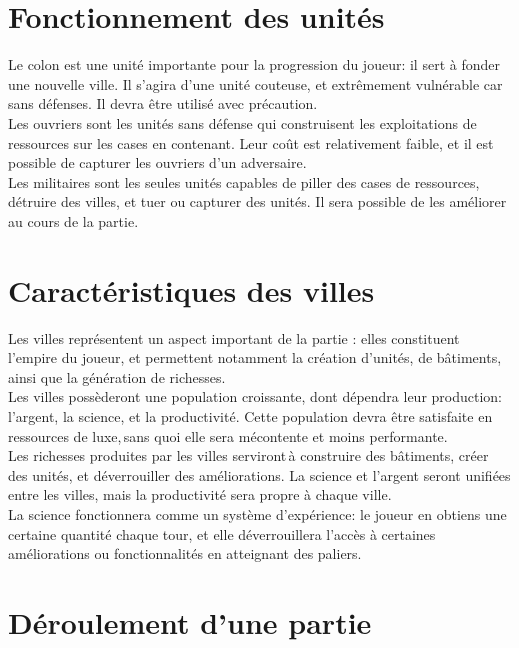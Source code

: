 \documentclass[12pt]{report}
\begin{document}
\begin{titlepage}
\section{Fonctionnement des unités}

Le colon est une unité importante pour la progression du joueur: il sert à fonder une nouvelle ville. Il s'agira d'une unité couteuse, et extrêmement vulnérable car sans défenses. Il devra être utilisé avec précaution.\\

Les ouvriers sont les unités sans défense qui construisent les exploitations de ressources sur les cases en contenant. Leur coût est relativement faible, et il est possible de capturer les ouvriers d'un adversaire.\\

Les militaires sont les seules unités capables de piller des cases de ressources, détruire des villes, et tuer ou capturer des unités. Il sera possible de les améliorer au cours de la partie.

\section{Caractéristiques des villes}

Les villes représentent un aspect important de la partie : elles constituent l'empire du joueur, et permettent notamment la création d'unités, de bâtiments, ainsi que la génération de richesses. \\

Les villes possèderont une population croissante, dont dépendra leur production: l'argent, la science, et la productivité. Cette population devra être satisfaite en ressources de luxe, sans quoi elle sera mécontente et moins performante.\\

Les richesses produites par les villes serviront à construire des bâtiments, créer des unités, et déverrouiller des améliorations. La science et l'argent seront unifiées entre les villes, mais la productivité sera propre à chaque ville.\\

La science fonctionnera comme un système d'expérience: le joueur en obtiens une certaine quantité chaque tour, et elle déverrouillera l'accès à certaines améliorations ou fonctionnalités en atteignant des paliers.

\section{Déroulement d'une partie}


\end{titlepage}
\end{document}
